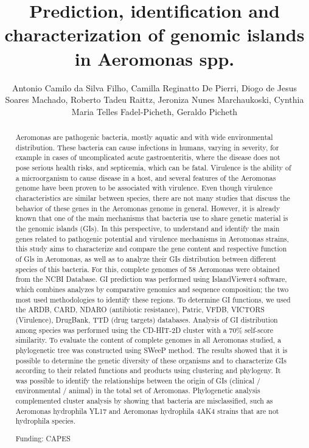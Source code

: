 \documentclass[twoside]{article}
\title{\vspace{-15mm}\fontsize{24pt}{10pt}\selectfont\textbf{ Prediction,  identification and characterization of genomic islands in Aeromonas spp. }} %
\author{ Antonio Camilo da Silva Filho, Camilla Reginatto De Pierri, Diogo de Jesus Soares Machado, Roberto Tadeu Raittz, Jeroniza Nunes  Marchaukoski, Cynthia Maria Telles Fadel-Picheth, Geraldo Picheth }
\affil{ Federal University of Paran\'a }
\date{}
\begin{document}
  
  
  \maketitle %
  
  
  \thispagestyle{fancy} %
  
  
  \begin{abstract}
  Aeromonas are pathogenic bacteria,  mostly aquatic and with wide environmental distribution. These bacteria can cause infections in humans,  varying in severity,  for example in cases of uncomplicated acute gastroenteritis,  where the disease does not pose serious health risks,  and septicemia,  which can be fatal. Virulence is the ability of a microorganism to cause disease in a host,  and several features of the Aeromonas genome have been proven to be associated with virulence. Even though virulence characteristics are similar between species,  there are not many studies that discuss the behavior of these genes in the Aeromonas genome in general. However,  it is already known that one of the main mechanisms that bacteria use to share genetic material is the genomic islands (GIs). In this perspective,  to understand and identify the main genes related to pathogenic potential and virulence mechanisms in Aeromonas strains,  this study aims to characterize and compare the gene content and respective function of Gls in Aeromonas,  as well as to analyze their GIs distribution between different species of this bacteria. For this,  complete genomes of 58 Aeromonas were obtained from the NCBI Database. GI prediction was performed using IslandViewer4 software,  which combines analyzes by comparative genomics and sequence composition; the two most used methodologies to identify these regions. To determine GI functions,  we used the ARDB,  CARD,  NDARO (antibiotic resistance),  Patric,  VFDB,  VICTORS (Virulence),  DrugBank,  TTD (drug targets) databases. Analysis of GI distribution among species was performed using the CD-HIT-2D cluster with a 70\% self-score similarity. To evaluate the content of complete genomes in all Aeromonas studied,  a phylogenetic tree was constructed using SWeeP method. The results showed that it is possible to determine the genetic diversity of these organisms and to characterize GIs according to their related functions and products using clustering and phylogeny. It was possible to identify the relationships between the origin of GIs (clinical / environmental / animal) in the total set of Aeromonas. Phylogenetic analysis complemented cluster analysis by showing that bacteria are misclassified,  such as Aeromonas hydrophila YL17 and Aeromonas hydrophila 4AK4 strains that are not hydrophila species.
  
  Funding: CAPES \\ 
  \end{abstract}
  
\end{document}
